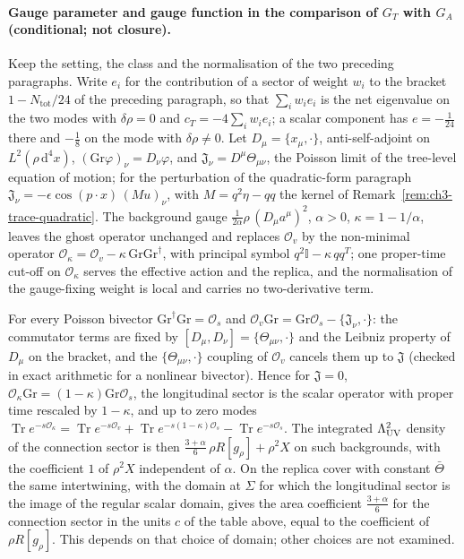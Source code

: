 \paragraph{Gauge parameter and gauge function in the comparison of \(G_T\) with \(G_A\) (conditional; not closure).}
Keep the setting, the class and the normalisation of the two preceding paragraphs. Write \(e_i\) for the contribution of a sector of weight \(w_i\) to the bracket \(1-N_{\mathrm{tot}}/24\) of the preceding paragraph, so that \(\sum_iw_ie_i\) is the net eigenvalue on the two modes with \(\delta\rho=0\) and \(c_T=-4\sum_iw_ie_i\); a scalar component has \(e=-\tfrac1{24}\) there and \(-\tfrac18\) on the mode with \(\delta\rho\neq0\). Let \(D_\mu=\{x_\mu,\cdot\}\), anti-self-adjoint on \(L^2(\rho\,\mathrm d^4x)\), \((\mathrm{Gr}\varphi)_\nu=D_\nu\varphi\), and \(\mathfrak J_\nu=D^\mu\Theta_{\mu\nu}\), the Poisson limit of the tree-level equation of motion; for the perturbation of the quadratic-form paragraph \(\mathfrak J_\nu=-\epsilon\cos(p\cdot x)\,(Mu)_\nu\), with \(M=q^2\eta-qq\) the kernel of Remark~\ref{rem:ch3-trace-quadratic}. The background gauge \(\tfrac1{2\alpha}\rho\,(D_\mu a^\mu)^2\), \(\alpha>0\), \(\kappa=1-1/\alpha\), leaves the ghost operator unchanged and replaces \(\mathcal O_v\) by the non-minimal operator \(\mathcal O_\kappa=\mathcal O_v-\kappa\,\mathrm{Gr}\mathrm{Gr}^\dagger\), with principal symbol \(q^2\mathbb I-\kappa\,qq^{T}\); one proper-time cut-off on \(\mathcal O_\kappa\) serves the effective action and the replica, and the normalisation of the gauge-fixing weight is local and carries no two-derivative term.

For every Poisson bivector \(\mathrm{Gr}^\dagger\mathrm{Gr}=\mathcal O_s\) and \(\mathcal O_v\mathrm{Gr}=\mathrm{Gr}\mathcal O_s-\{\mathfrak J_\nu,\cdot\}\): the commutator terms are fixed by \([D_\mu,D_\nu]=\{\Theta_{\mu\nu},\cdot\}\) and the Leibniz property of \(D_\mu\) on the bracket, and the \(\{\Theta_{\mu\nu},\cdot\}\) coupling of \(\mathcal O_v\) cancels them up to \(\mathfrak J\) (checked in exact arithmetic for a nonlinear bivector). Hence for \(\mathfrak J=0\), \(\mathcal O_\kappa\mathrm{Gr}=(1-\kappa)\mathrm{Gr}\mathcal O_s\), the longitudinal sector is the scalar operator with proper time rescaled by \(1-\kappa\), and up to zero modes \(\operatorname{Tr}e^{-s\mathcal O_\kappa}=\operatorname{Tr}e^{-s\mathcal O_v}+\operatorname{Tr}e^{-s(1-\kappa)\mathcal O_s}-\operatorname{Tr}e^{-s\mathcal O_s}\). The integrated \(\Lambda_{\mathrm{UV}}^2\) density of the connection sector is then \(\tfrac{3+\alpha}6\,\rho R[g_\rho]+\rho^2X\) on such backgrounds, with the coefficient \(1\) of \(\rho^2X\) independent of \(\alpha\). On the replica cover with constant \(\bar\Theta\) the same intertwining, with the domain at \(\Sigma\) for which the longitudinal sector is the image of the regular scalar domain, gives the area coefficient \(\tfrac{3+\alpha}6\) for the connection sector in the units \(c\) of the table above, equal to the coefficient of \(\rho R[g_\rho]\). This depends on that choice of domain; other choices are not examined.

